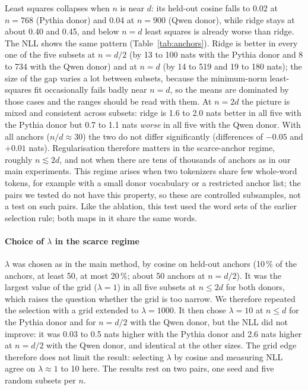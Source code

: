 \documentclass[preprint,12pt]{elsarticle}
\begin{document}
Least squares collapses when $n$ is near $d$: its held-out cosine falls to 0.02 at $n=768$ (Pythia donor) and 0.04 at $n=900$ (Qwen donor), while ridge stays at about 0.40 and 0.45, and below $n=d$ least squares is already worse than ridge. The NLL shows the same pattern (Table~\ref{tab:anchors}). Ridge is better in every one of the five subsets at $n=d/2$ (by 13 to 100 nats with the Pythia donor and 8 to 734 with the Qwen donor) and at $n=d$ (by 14 to 519 and 19 to 180 nats); the size of the gap varies a lot between subsets, because the minimum-norm least-squares fit occasionally fails badly near $n=d$, so the means are dominated by those cases and the ranges should be read with them. At $n=2d$ the picture is mixed and consistent across subsets: ridge is 1.6 to 2.0 nats better in all five with the Pythia donor but 0.7 to 1.1 nats \emph{worse} in all five with the Qwen donor. With all anchors ($n/d\approx30$) the two do not differ significantly (differences of $-0.05$ and $+0.01$ nats). Regularisation therefore matters in the scarce-anchor regime, roughly $n\lesssim 2d$, and not when there are tens of thousands of anchors as in our main experiments. This regime arises when two tokenizers share few whole-word tokens, for example with a small donor vocabulary or a restricted anchor list; the pairs we tested do not have this property, so these are controlled subsamples, not a test on such pairs. Like the ablation, this test used the word sets of the earlier selection rule; both maps in it share the same words.

\paragraph{Choice of $\lambda$ in the scarce regime} $\lambda$ was chosen as in the main method, by cosine on held-out anchors (10\,\% of the anchors, at least 50, at most 20\,\%; about 50 anchors at $n=d/2$). It was the largest value of the grid ($\lambda=1$) in all five subsets at $n\le2d$ for both donors, which raises the question whether the grid is too narrow. We therefore repeated the selection with a grid extended to $\lambda=1000$. It then chose $\lambda=10$ at $n\le d$ for the Pythia donor and for $n=d/2$ with the Qwen donor, but the NLL did not improve: it was 0.03 to 0.5 nats higher with the Pythia donor and 2.6 nats higher at $n=d/2$ with the Qwen donor, and identical at the other sizes. The grid edge therefore does not limit the result: selecting $\lambda$ by cosine and measuring NLL agree on $\lambda\approx1$ to 10 here. The results rest on two pairs, one seed and five random subsets per $n$.
\end{document}
